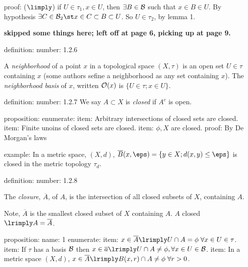         proof:
            ($\limply$) if $U \in \tau_1, x \in U$, then $\exists B \in \mathcal{B}$ such that $x \in B \in U$. By hypothesis $\exists C \in \B_2 \st x \in C \subset B \subset U$. So $U \in \tau_2$, by lemma 1.
        
    { \bf skipped some things here; left off at page 6, picking up at page 9.}

    
    
    
    
    
    
    
    definition:
        number:
            1.2.6
        
        A \emph{neighborhood} of a point $x$ in a topological space $(X, \tau)$ is an open set $U \in \tau$ containing $x$ (some authors sefine a neighborhood as any set containing $x$). The \emph{neighborhood basis} of $x$, written $\mathcal{O}(x)$ is $\{ U \in \tau; x \in U\}$.
    
    
    definition:
        number:
            1.2.7
        We say $A \subset X$ is \emph{closed} if $A^c$ is open.
        
    proposition:
        enumerate:
            item:
                Arbitrary intersections of closed sets are closed.
            item:
                Finite unoins of closed sets are closed.
            item:
                $\phi, X$ are closed.
        proof:
            By De Morgan's laws

    example:
        In a metric space, $(X, d)$, $\overline{B}(x, \eps) = \{ y \in X; d(x,y) \le \eps \}$ is closed in the metric topology $\tau_d$.
    
        
        
    definition:
        number:
            1.2.8
        
        The \emph{closure}, $\overline{A}$, of $A$, is the intersection of all closed subsets of $X$, containing $A$.

        Note, $\overline{A}$ is the smallest closed subset of $X$ containing $A$. $A$ closed $\lrimply A = \overline{A}$.
        
        
    proposition:
        name:
            1
        enumerate:
            item:
                $x \in \overline{A} \lrimply U \cap A = \phi \; \forall x \in U \in \tau$.
            item:
                If $\tau$ has a basis $\mathcal{B}$ then $x \in \overline{a} \lrimply U \cap A \not = \phi, \forall x \in U \in \B$.
            item:
                In a metric space $(X, d)$, $x \in \overline{A} \lrimply B(x, r) \cap A \not = \phi \; \forall r>0$.
        
